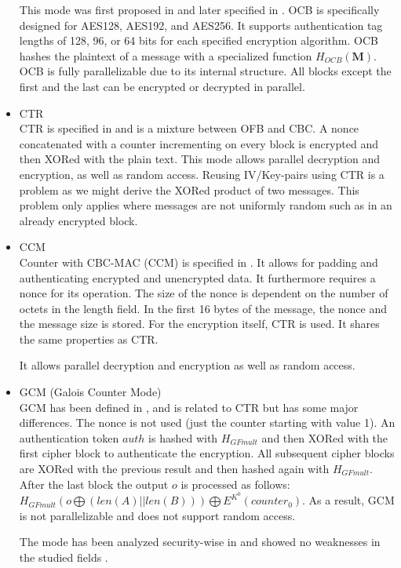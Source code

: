 \begin{itemize}
	This mode was first proposed in \cite{rogaway2003ocb} and later specified in \cite{krovetz-ocb-04}. OCB is specifically designed for AES128, AES192, and AES256. It supports authentication tag lengths of 128, 96, or 64 bits for each specified encryption algorithm. OCB hashes the plaintext of a message with a specialized function $H_{OCB}(\mathbf{M})$. OCB is fully parallelizable due to its internal structure. All blocks except the first and the last can be encrypted or decrypted in parallel.
	\item CTR\\
	CTR is specified in \cite{lipmaa2000ctr} and is a mixture between OFB and CBC. A nonce concatenated with a counter incrementing on every block is encrypted and then XORed with the plain text. This mode allows parallel decryption and encryption, as well as random access. Reusing IV/Key-pairs using CTR is a problem as we might derive the XORed product of two messages. This problem only applies where messages are not uniformly random such as in an already encrypted block.
	\item CCM\\
	Counter with CBC-MAC (CCM) is specified in \cite{rfc3610}. It allows for padding and authenticating encrypted and unencrypted data. It furthermore requires a nonce for its operation. The size of the nonce is dependent on the number of octets in the length field. In the first 16 bytes of the message, the nonce and the message size is stored. For the encryption itself, CTR is used. It shares the same properties as CTR. 
	
	It allows parallel decryption and encryption as well as random access.
	\item GCM (Galois Counter Mode)\\
	GCM has been defined in \cite{mcgrew2004galois}, and is related to CTR but has some major differences. The nonce is not used (just the counter starting with value 1). An authentication token $auth$ is hashed with $H_{GFmult}$ and then XORed with the first cipher block to authenticate the encryption. All subsequent cipher blocks are XORed with the previous result and then hashed again with $H_{GFmult}$. After the last block the output $o$ is processed  as follows: $H_{GFmult}(o\bigoplus (len(A)||len(B))) \bigoplus E^{K^0}(counter_0)$. As a result, GCM is not parallelizable and does not support random access.
	
	The mode has been analyzed security-wise in \citeyear{mcgrew2004security} and showed no weaknesses in the studied fields \cite{mcgrew2004security}. 
	

\end{itemize}
